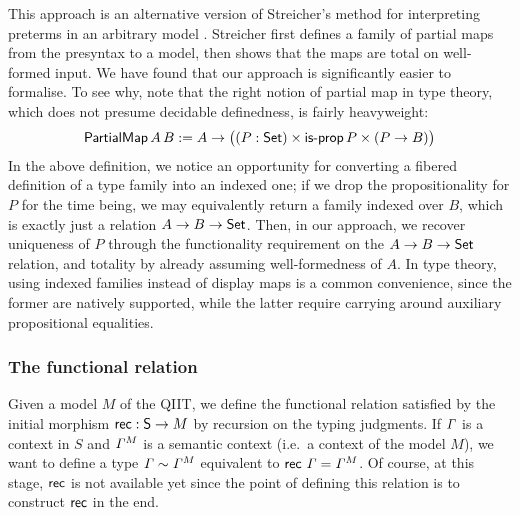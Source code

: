 This approach is an alternative version of Streicher's method for interpreting
preterms in an arbitrary model \cite{streichersemantics}. Streicher first defines
a family of partial maps from the presyntax to a model, then shows that the maps
are total on well-formed input. We have found that our approach is significantly
easier to formalise. To see why, note that the right notion of partial map in
type theory, which does not presume decidable definedness, is fairly
heavyweight:
\[
  \mathsf{PartialMap}\,A\,B := A\rightarrow \big((P : \mathsf{Set})\times\mathsf{is\text{-}prop}\,P\times (P \rightarrow B)\big)
\]
In the above definition, we notice an opportunity for converting a fibered
definition of a type family into an indexed one; if we drop the propositionality
for $P$ for the time being, we may equivalently return a family indexed over
$B$, which is exactly just a relation $A\rightarrow B\rightarrow\mathsf{Set}$. Then, in our approach, we
recover uniqueness of $P$ through the functionality requirement on the $A\rightarrow
B\rightarrow\mathsf{Set}$ relation, and totality by already assuming well-formedness of $A$. In
type theory, using indexed families instead of display maps is a common
convenience, since the former are natively supported, while the
latter require carrying around auxiliary propositional equalities.

\subsubsection{The functional relation}

Given a model $M$ of the QIIT, we define the functional relation satisfied by
the initial morphism $\mathsf{rec} : \mathsf{S}\to M$ by recursion on the typing judgments.
If $\mathit{\Gamma}$ is a context in $S$ and ${\mathit{\Gamma}}^M$ is a semantic context
(i.e.\ a context of the model $M$), we want to define a type
$\mathit{\Gamma}\sim {\mathit{\Gamma}}^M$ equivalent to $\mathsf{rec}\,\,\mathit{\Gamma}={\mathit{\Gamma}}^M$. Of
course, at this stage, $\mathsf{rec}$ is not available yet since the point of
defining this relation is to construct $\mathsf{rec}$ in the end.


